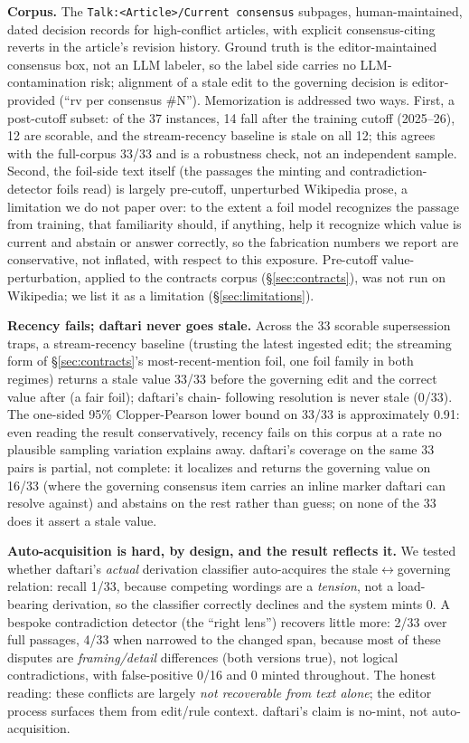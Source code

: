 \documentclass[11pt]{article}
\begin{document}
\textbf{Corpus.} The \texttt{Talk:<Article>/Current consensus} subpages, human-maintained, dated
decision records for high-conflict articles, with explicit consensus-citing reverts in the
article's revision history. Ground truth is the editor-maintained consensus box, not an LLM
labeler, so the label side carries no LLM-contamination risk; alignment of a stale edit to
the governing decision is editor-provided (``rv per consensus \#N''). Memorization is addressed
two ways. First, a post-cutoff subset: of the 37 instances, 14 fall after the training
cutoff (2025--26), 12 are scorable, and the stream-recency baseline is stale on all 12; this
agrees with the full-corpus 33/33 and is a robustness check, not an independent sample.
Second, the foil-side text itself (the passages the minting and contradiction-detector
foils read) is largely pre-cutoff, unperturbed Wikipedia prose, a limitation we do not paper
over: to the extent a foil model recognizes the passage from training, that familiarity
should, if anything, help it recognize which value is current and abstain or answer
correctly, so the fabrication numbers we report are conservative, not inflated, with respect
to this exposure. Pre-cutoff value-perturbation, applied to the contracts corpus (\S\ref{sec:contracts}), was
not run on Wikipedia; we list it as a limitation (\S\ref{sec:limitations}).

\textbf{Recency fails; daftari never goes stale.} Across the 33 scorable supersession traps, a
stream-recency baseline (trusting the latest ingested edit; the streaming form of \S\ref{sec:contracts}'s
most-recent-mention foil, one foil family in both regimes) returns a stale value 33/33
before the governing edit and the correct value after (a fair foil); daftari's chain-
following resolution is never stale (0/33). The one-sided 95\% Clopper-Pearson lower bound
on 33/33 is approximately 0.91: even reading the result conservatively, recency fails on this
corpus at a rate no plausible sampling variation explains away. daftari's coverage on the same
33 pairs is partial, not complete: it localizes and returns the governing value on 16/33
(where the governing consensus item carries an inline marker daftari can resolve against) and
abstains on the rest rather than guess; on none of the 33 does it assert a stale value.

\textbf{Auto-acquisition is hard, by design, and the result reflects it.} We tested whether
daftari's \emph{actual} derivation classifier auto-acquires the stale$\leftrightarrow$governing relation: recall
1/33, because competing wordings are a \emph{tension}, not a load-bearing derivation, so the
classifier correctly declines and the system mints 0. A bespoke contradiction detector
(the ``right lens'') recovers little more: 2/33 over full passages, 4/33 when narrowed to the
changed span, because most of these disputes are \emph{framing/detail} differences (both
versions true), not logical contradictions, with false-positive 0/16 and 0 minted
throughout. The honest reading: these conflicts are largely \emph{not recoverable from text
alone}; the editor process surfaces them from edit/rule context. daftari's claim is
no-mint, not auto-acquisition.
\end{document}
